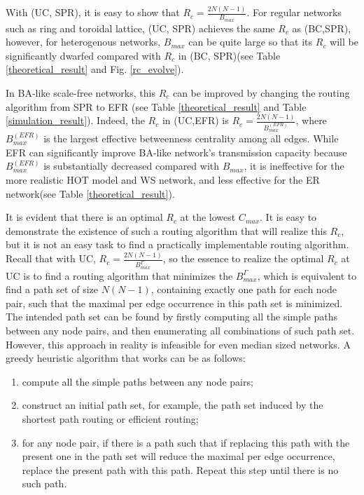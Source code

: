 \documentclass[journal]{IEEEtran}
\begin{document}
{With (UC, SPR), it is easy to show that
$R_c=\frac{2N(N-1)}{B_{max}}$. For regular networks such as ring and
toroidal lattice, (UC, SPR) achieves the same $R_c$ as (BC,SPR),
however, for heterogenous networks, $B_{max}$ can be quite large so
that its $R_c$ will be significantly dwarfed compared with $R_c$ in
(BC, SPR)(see Table \ref{theoretical_result} and Fig.
\ref{rc_evolve}).

In BA-like scale-free networks, this $R_c$ can be improved by
changing the routing algorithm from SPR to EFR (see Table
\ref{theoretical_result} and Table \ref{simulation_result}). Indeed,
the $R_c$ in (UC,EFR) is $R_c = \frac{2N(N-1)}{B^{(EFR)}_{max}}$,
where $B^{(EFR)}_{max}$ is the largest effective betweenness
centrality among all edges. While EFR can significantly improve
BA-like network's transmission capacity because $B^{(EFR)}_{max}$ is
substantially decreased compared with $B_{max}$, it is ineffective
for the more realistic HOT model and WS network, and less effective
for the ER network(see Table \ref{theoretical_result}).

It is evident that there is an optimal $R_c$ at the lowest
$C_{max}$. It is easy to demonstrate the existence of such a routing
algorithm that will realize this $R_c$, but it is not an easy task
to find a practically implementable routing algorithm. Recall that
with UC, $R_c=\frac{2N(N-1)}{B^{\Gamma}_{max}}$, so the essence to
realize the optimal $R_c$ at UC is to find a routing algorithm that
minimizes the $B^{\Gamma}_{max}$, which is equivalent to find a path
set of size $N(N-1)$, containing exactly one path for each node
pair, such that the maximal per edge occurrence in this path set is
minimized. The intended path set can be found by firstly computing
all the simple paths between any node pairs, and then enumerating
all combinations of such path set. However, this approach in reality
is infeasible for even median sized networks. A greedy heuristic
algorithm that works can be as follows:

 \begin{enumerate}
 \item
compute all the simple paths between any node pairs;
\item construct
an initial path set, for example, the path set induced by the
shortest path routing or efficient routing;
\item for any node pair, if there is a path such that if replacing this path with the
present one in the path set will reduce the maximal per edge
occurrence, replace the present path with this path. Repeat this
step until there is no such path.
\end{enumerate}

}
\end{document}
